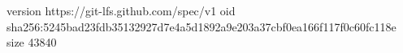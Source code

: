version https://git-lfs.github.com/spec/v1
oid sha256:5245bad23fdb35132927d7e4a5d1892a9e203a37cbf0ea166f117f0c60fc118e
size 43840
